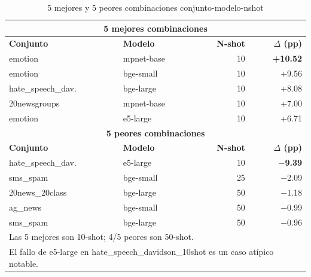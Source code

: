 \begin{table}[htbp]
\centering
\caption{5 mejores y 5 peores combinaciones conjunto-modelo-nshot}
\label{tab:embedding_extremes}
\begin{tabular}{llrr}
\toprule
\multicolumn{4}{c}{\textbf{5 mejores combinaciones}} \\
\midrule
\textbf{Conjunto} & \textbf{Modelo} & \textbf{N-shot} & \textbf{$\Delta$ (pp)} \\
\midrule
emotion          & mpnet-base     & 10 & \textbf{+10.52} \\
emotion          & bge-small      & 10 & +9.56 \\
hate\_speech\_dav. & bge-large      & 10 & +8.08 \\
20newsgroups     & mpnet-base     & 10 & +7.00 \\
emotion          & e5-large       & 10 & +6.71 \\
\midrule
\multicolumn{4}{c}{\textbf{5 peores combinaciones}} \\
\midrule
\textbf{Conjunto} & \textbf{Modelo} & \textbf{N-shot} & \textbf{$\Delta$ (pp)} \\
\midrule
hate\_speech\_dav. & e5-large       & 10 & \textbf{$-$9.39} \\
sms\_spam        & bge-small      & 25 & $-$2.09 \\
20news\_20class   & bge-large      & 50 & $-$1.18 \\
ag\_news         & bge-small      & 50 & $-$0.99 \\
sms\_spam        & bge-large      & 50 & $-$0.96 \\
\midrule
\multicolumn{4}{l}{\small Las 5 mejores son 10-shot; 4/5 peores son 50-shot.} \\
\multicolumn{4}{l}{\small El fallo de e5-large en hate\_speech\_davidson\_10shot es un caso atípico notable.} \\
\bottomrule
\end{tabular}
\end{table}
